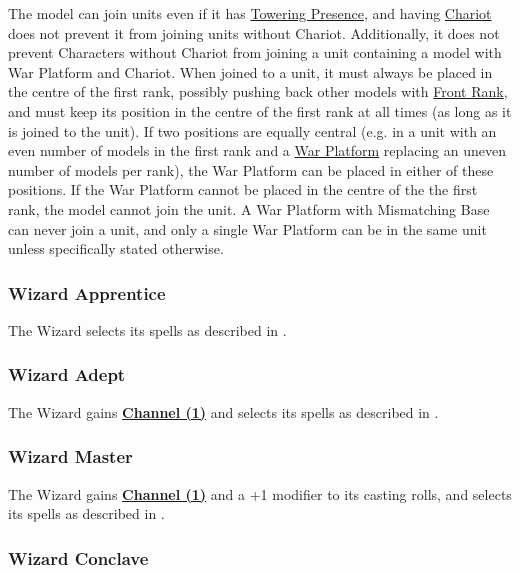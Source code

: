 The model can join units even if it has \hyperref[towering_presence]{Towering Presence}, and having \hyperref[chariot]{Chariot} does not prevent it from joining units without Chariot. Additionally, it does not prevent Characters without Chariot from joining a unit containing a model with War Platform and Chariot. When joined to a unit, it must always be placed in the centre of the first rank, possibly pushing back other models with \hyperref[front_rank]{Front Rank}, and must keep its position in the centre of the first rank at all times (as long as it is joined to the unit). If two positions are equally central (e.g. in a unit with an even number of models in the first rank and a \hyperref[war_platform]{War Platform} replacing an uneven number of models per rank), the War Platform can be placed in either of these positions. If the War Platform cannot be placed in the centre of the the first rank, the model cannot join the unit. A War Platform with Mismatching Base can never join a unit, and only a single War Platform can be in the same unit unless specifically stated otherwise.

\subsubsection{Wizard Apprentice}
\idx[main=y]{\wizardapprentice}\label{wizard_apprentice}

The Wizard selects its spells as described in .

\subsubsection{Wizard Adept}
\idx[main=y]{\wizardadept}\label{wizard_adept}

The Wizard gains \textbf{\hyperref[channel]{Channel (1)}} and selects its spells as described in .

\subsubsection{Wizard Master}
\idx[main=y]{\wizardmaster}\label{wizard_master}

The Wizard gains \textbf{\hyperref[channel]{Channel (1)}} and a +1 modifier to its casting rolls, and selects its spells as described in .

\subsubsection{Wizard Conclave}
\idx[main=y]{\wizardconclave}\label{wizard_conclave}

